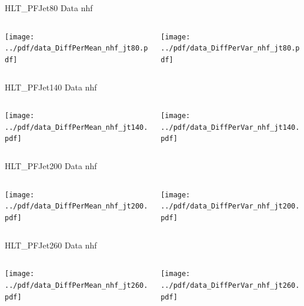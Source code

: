 \documentclass[9pt]{beamer}
\begin{document}
\begin{frame}[t]{HLT\_PFJet80 Data nhf}
\begin{columns}[T]
  \begin{column}{.5\textwidth}
  \texttt{[image: ../pdf/data\_DiffPerMean\_nhf\_jt80.pdf]}
  \end{column}
  \begin{column}{.5\textwidth}
  \texttt{[image: ../pdf/data\_DiffPerVar\_nhf\_jt80.pdf]}
  \end{column}
\end{columns}
\end{frame}

\begin{frame}[t]{HLT\_PFJet140 Data nhf}
\begin{columns}[T]
  \begin{column}{.5\textwidth}
  \texttt{[image: ../pdf/data\_DiffPerMean\_nhf\_jt140.pdf]}
  \end{column}
  \begin{column}{.5\textwidth}
  \texttt{[image: ../pdf/data\_DiffPerVar\_nhf\_jt140.pdf]}
  \end{column}
\end{columns}
\end{frame}

\begin{frame}[t]{HLT\_PFJet200 Data nhf}
\begin{columns}[T]
  \begin{column}{.5\textwidth}
  \texttt{[image: ../pdf/data\_DiffPerMean\_nhf\_jt200.pdf]}
  \end{column}
  \begin{column}{.5\textwidth}
  \texttt{[image: ../pdf/data\_DiffPerVar\_nhf\_jt200.pdf]}
  \end{column}
\end{columns}
\end{frame}

\begin{frame}[t]{HLT\_PFJet260 Data nhf}
\begin{columns}[T]
  \begin{column}{.5\textwidth}
  \texttt{[image: ../pdf/data\_DiffPerMean\_nhf\_jt260.pdf]}
  \end{column}
  \begin{column}{.5\textwidth}
  \texttt{[image: ../pdf/data\_DiffPerVar\_nhf\_jt260.pdf]}
  \end{column}
\end{columns}
\end{frame}
\end{document}
